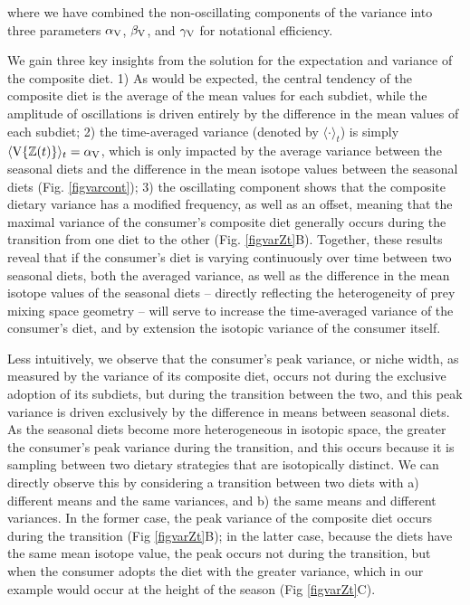 \documentclass{frontiersSCNS}
\begin{document}
\noindent where we have combined the non-oscillating components of the variance into three parameters $\alpha_{\rm V}$, $\beta_{\rm V}$, and $\gamma_{\rm V}$ for notational efficiency.

We gain three key insights from the solution for the expectation and variance of the composite diet.
1) As would be expected, the central tendency of the composite diet is the average of the mean values for each subdiet, while the amplitude of oscillations is driven entirely by the difference in the mean values of each subdiet;
2) the time-averaged variance (denoted by $\langle \cdot \rangle_t$) is simply $\langle {\rm V}\{\mathbb{Z}(t)\} \rangle_t = \alpha_{\rm V}$, which is only impacted by the average variance between the seasonal diets and the difference in the mean isotope values between the seasonal diets (Fig. \ref{figvarcont});
3) the oscillating component shows that the composite dietary variance has a modified frequency, as well as an offset, meaning that the maximal variance of the consumer's composite diet generally occurs during the transition from one diet to the other (Fig. \ref{figvarZt}B).
Together, these results reveal that if the consumer's diet is varying continuously over time between two seasonal diets, both the averaged variance, as well as the difference in the mean isotope values of the seasonal diets -- directly reflecting the heterogeneity of prey mixing space geometry -- will serve to increase the time-averaged variance of the consumer's diet, and by extension the isotopic variance of the consumer itself.

Less intuitively, we observe that the consumer's peak variance, or niche width, as measured by the variance of its composite diet, occurs not during the exclusive adoption of its subdiets, but during the transition between the two, and this peak variance is driven exclusively by the difference in means between seasonal diets.
As the seasonal diets become more heterogeneous in isotopic space, the greater the consumer's peak variance during the transition, and this occurs because it is sampling between two dietary strategies that are isotopically distinct.
We can directly observe this by considering a transition between two diets with  a) different means and the same variances, and b) the same means and different variances.
In the former case, the peak variance of the composite diet occurs during the transition (Fig \ref{figvarZt}B); in the latter case, because the diets have the same mean isotope value, the peak occurs not during the transition, but when the consumer adopts the diet with the greater variance, which in our example would occur at the height of the season (Fig \ref{figvarZt}C).
\end{document}
